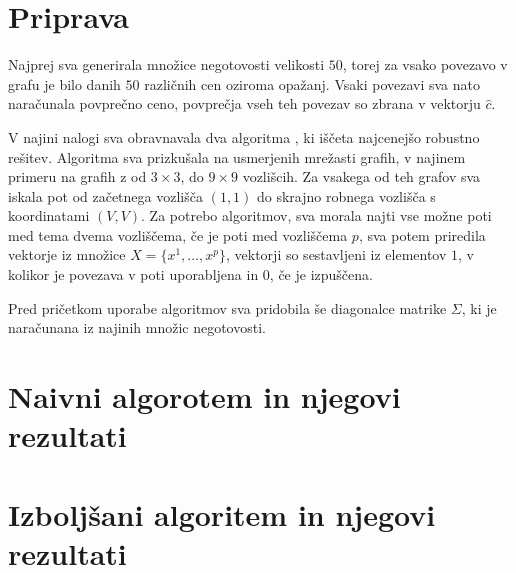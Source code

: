 \documentclass[a4paper, 12 pt]{article}
\theoremstyle{definition} %
\theoremstyle{plain} %
\theoremstyle{definition}
\begin{document}
\section{Priprava}

Najprej sva generirala množice negotovosti velikosti $50$, torej za vsako povezavo v grafu je bilo danih $50$ različnih cen oziroma opažanj. Vsaki povezavi sva nato naračunala povprečno ceno, povprečja vseh teh povezav so zbrana v vektorju $\hat{c}$.\newline
  
V najini nalogi sva obravnavala dva algoritma , ki iščeta najcenejšo robustno rešitev. Algoritma sva prizkušala na usmerjenih mrežasti grafih, v najinem primeru na grafih  z od $3\times3$, do $9\times9$ vozlišcih. Za vsakega od teh grafov sva iskala pot od začetnega vozlišča $(1, 1)$ do skrajno robnega vozlišča s koordinatami $(V, V)$. Za potrebo algoritmov, sva morala najti vse možne poti med tema dvema vozliščema, če je poti med vozliščema $p$, sva potem priredila vektorje iz množice $X = \{x^1, \dots, x^p \}$, vektorji so sestavljeni iz elementov $1$, v kolikor je povezava v poti uporabljena in $0$, če je izpuščena.\newline

Pred pričetkom uporabe algoritmov sva pridobila še diagonalce matrike $\Sigma$, ki je naračunana iz najinih množic negotovosti.



\section{Naivni algorotem in njegovi rezultati}

\section{Izboljšani algoritem in njegovi rezultati}
\end{document}
